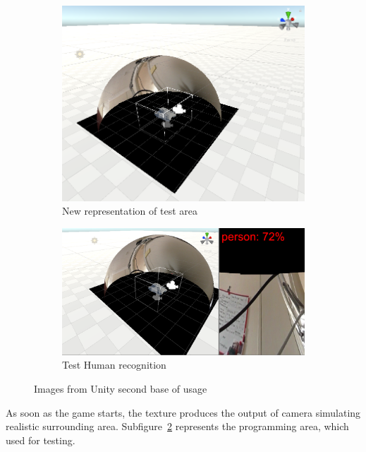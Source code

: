 	\begin{figure}[H]
    	\centering
    	\begin{subfigure}[b]{0.4\textwidth}
    		\includegraphics[width=\linewidth]{project/images/newLook2.PNG}
    		\caption{New representation of test area}
    		\label{fig:newScene1}
    	\end{subfigure}
    	\begin{subfigure}[b]{0.4\textwidth}
    		\includegraphics[width=\linewidth]{project/images/recognition.PNG}
    		\caption{Test Human recognition}
    		\label{fig:newScene2}
    	\end{subfigure}			
    	\caption{Images from Unity second base of usage}\label{fig:scene-developemt}
    \end{figure}
	As soon as the game starts, the texture produces the output of camera simulating realistic surrounding area.
    Subfigure~\ref{fig:newScene2} represents the programming area, which used for testing.
